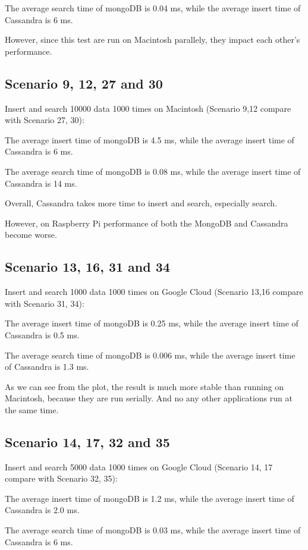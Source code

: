 The average search time of mongoDB is 0.04 ms, while the average insert time of 
Cassandra is 6 ms.

However, since this test are run on Macintosh parallely, they impact each other's 
performance.

\subsection{Scenario 9, 12, 27 and 30}
Insert and search 10000 data 1000 times on Macintosh 
(Scenario 9,12 compare with Scenario 27, 30):

The average insert time of mongoDB is 4.5 ms, while the average insert time of 
Cassandra is 6 ms.

The average search time of mongoDB is 0.08 ms, while the average insert time of 
Cassandra is 14 ms.

Overall, Cassandra takes more time to insert and search, especially search. 

However, on Raspberry Pi performance of  both the MongoDB and Cassandra become worse.



\subsection{Scenario 13, 16, 31 and 34}
Insert and search 1000 data 1000 times on Google Cloud
(Scenario 13,16 compare with Scenario 31, 34):

The average insert time of mongoDB is 0.25 ms, while the average insert time of 
Cassandra is 0.5 ms.

The average search time of mongoDB is 0.006 ms, while the average insert time of 
Cassandra is 1.3 ms.

As we can see from the plot, the result is much more stable than running on Macintosh, 
because they are run serially. And no any other applications run at the same time. 

\subsection{Scenario 14, 17, 32 and 35}
Insert and search 5000 data 1000 times on Google Cloud 
(Scenario 14, 17 compare with Scenario 32, 35):

The average insert time of mongoDB is 1.2 ms, while the average insert time of 
Cassandra is 2.0 ms.

The average search time of mongoDB is 0.03 ms, while the average insert time of 
Cassandra is 6 ms.

